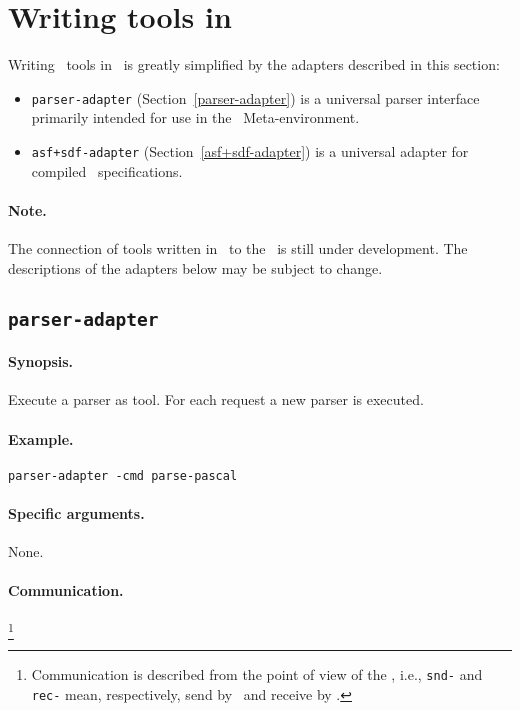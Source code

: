 \section{\label{ToolsInASFSDF}Writing tools in \ASFSDF}

Writing \TB\ tools in \ASFSDF\ is greatly simplified by the adapters described in
this section:
\begin{itemize}
\item {\tt parser-adapter} (Section~\ref{parser-adapter}) is a universal parser 
interface primarily intended for use in the \ASFSDF\ Meta-environment.

\item {\tt asf+sdf-adapter} (Section~\ref{asf+sdf-adapter}) is a
universal adapter for compiled \ASFSDF\ specifications.

\end{itemize}

\paragraph{Note.} The connection of tools written in \ASFSDF\ to the \TB\ is
still under development. The descriptions of the adapters below may be
subject to change.

\subsection{\label{parser-adapter}{\tt parser-adapter}}

\paragraph{Synopsis.} Execute a parser as tool. For each request a new parser is executed.

\paragraph{Example.} {\tt parser-adapter -cmd parse-pascal}

\paragraph{Specific arguments.} None.

\paragraph{Communication.} \hspace{-0.3cm}\footnote{Communication is described
from the point of view of the \TB, i.e., {\tt snd-} and {\tt rec-}
mean, respectively, send by \TB\ and receive by \TB.}

